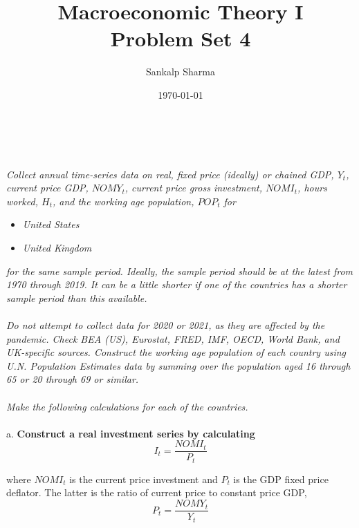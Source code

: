 \documentclass[12pt]{article}
\title{\textbf{Macroeconomic Theory I \\ Problem Set 4}}
\author{Sankalp Sharma}
\date{\today}
\theoremstyle{mytheoremstyle}
\theoremstyle{mytheoremstyle}
\theoremstyle{myproblemstyle}
\begin{document}
    \maketitle

    \noindent{}
\\ \\ 
\noindent \textit{Collect annual time-series data on real, fixed price (ideally) or chained GDP, $Y_t$, current price GDP, $NOMY_t$, current price gross investment, $NOMI_t$, hours worked, $H_t$, and the working age population, $POP_t$ for}

\begin{itemize}
    \item \textit{United States}
    \item \textit{United Kingdom }
\end{itemize}

\noindent \textit{for the same sample period. Ideally, the sample period should be at the latest from 1970 through 2019. It can be a little shorter if one of the countries has a shorter sample period than this available.}
\\
\\    
\textit{Do not attempt to collect data for 2020 or 2021, as they are affected by the pandemic. Check BEA (US), Eurostat, FRED, IMF, OECD, World Bank, and UK-specific sources. Construct the working age population of each country using U.N. Population Estimates data by summing over the population aged 16 through 65 or 20 through 69 or similar.}
\\
\\
\textit{Make the following calculations for each of the countries.}
\\
\\
a. \textbf{Construct a real investment series by calculating} $$I_t = \frac{NOMI_t}{P_t}$$

where $NOMI_t$ is the current price investment and $P_t$ is the GDP fixed price deflator. The latter is the ratio of current price to constant price GDP, $$ P_t = \frac{NOMY_t}{Y_t}$$
\end{document}
